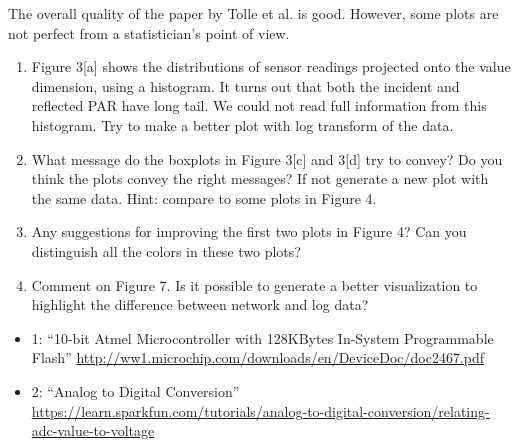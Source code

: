 \documentclass[]{article}
\providecommand{\tightlist}{%
  \setlength{\itemsep}{0pt}\setlength{\parskip}{0pt}}
\begin{document}
The overall quality of the paper by Tolle et al. is good. However, some
plots are not perfect from a statistician's point of view.

\begin{enumerate}[label=(\alph*)]
\item Figure 3[a] shows the distributions of sensor readings projected onto the value dimension, using a histogram. It turns out that both the incident and reflected PAR have long tail. We could not read full information from this histogram. Try to make a better plot with log transform of the data.
\item What message do the boxplots in Figure 3[c] and 3[d] try to convey? Do you think the plots convey the right messages? If not generate a new plot with the same data. Hint: compare to some plots in Figure 4.
\item Any suggestions for improving the first two plots in Figure 4? Can you distinguish all the colors in these two plots?
\item Comment on Figure 7. Is it possible to generate a better visualization to highlight the difference between network and log data?
\end{enumerate}

\begin{itemize}
\tightlist
\item
  1: ``10-bit Atmel Microcontroller with 128KBytes In-System
  Programmable Flash''
  \url{http://ww1.microchip.com/downloads/en/DeviceDoc/doc2467.pdf}
\item
  2: ``Analog to Digital Conversion''
  \url{https://learn.sparkfun.com/tutorials/analog-to-digital-conversion/relating-adc-value-to-voltage}
\end{itemize}
\end{document}
